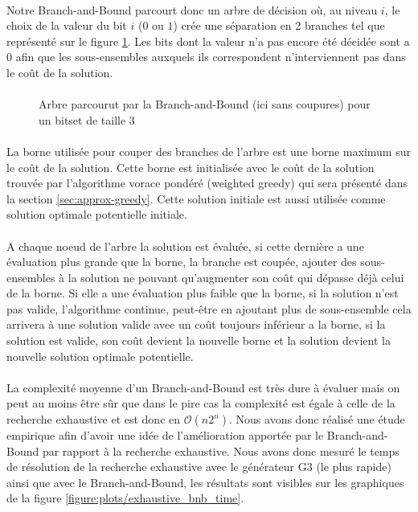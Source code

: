 \documentclass[12pt,letterpaper,twoside]{article}
\begin{document}
			\paragraph*{}
				Notre Branch-and-Bound parcourt donc un arbre de décision où, au niveau \(i\), le choix de la valeur du bit \(i\) (\(0\) ou \(1\)) crée une séparation en 2 branches tel que représenté sur le figure \ref{fig:bnb}. Les bits dont la valeur n'a pas encore été décidée sont a \(0\) afin que les sous-ensembles auxquels ils correspondent n'interviennent pas dans le coût de la solution.
			\paragraph*{}
			\begin{figure}[H]
				\centering%
				\resizebox{0.75\textwidth}{!}{}%
				\caption{Arbre parcourut par la Branch-and-Bound (ici sans coupures) pour un bitset de taille 3}%
				\label{fig:bnb}%
			\end{figure}
			\paragraph*{}
				La borne utilisée pour couper des branches de l'arbre est une borne maximum sur le coût de la solution. Cette borne est initialisée avec le coût de la solution trouvée par l'algorithme vorace pondéré (weighted greedy) qui sera présenté dans la section \ref{sec:approx-greedy}. Cette solution initiale est aussi utilisée comme solution optimale potentielle initiale.
			\paragraph*{}
				A chaque noeud de l'arbre la solution est évaluée, si cette dernière a une évaluation plus grande que la borne, la branche est coupée, ajouter des sous-ensembles à la solution ne pouvant qu'augmenter son coût qui dépasse déjà celui de la borne. Si elle a une évaluation plus faible que la borne, si la solution n'est pas valide, l'algorithme continue, peut-être en ajoutant plus de sous-ensemble cela arrivera à une solution valide avec un coût toujours inférieur a la borne, si la solution est valide, son coût devient la nouvelle borne et la solution devient la nouvelle solution optimale potentielle.
			\paragraph*{}
				La complexité moyenne d'un Branch-and-Bound est très dure à évaluer mais on peut au moins être sûr que dans le pire cas la complexité est égale à celle de la recherche exhaustive et est donc en \(\mathcal{O}(n2^n)\). Nous avons donc réalisé une étude empirique afin d'avoir une idée de l'amélioration apportée par le Branch-and-Bound par rapport à la recherche exhaustive. Nous avons donc mesuré le temps de résolution de la recherche exhaustive avec le générateur G3 (le plus rapide) ainsi que avec le Branch-and-Bound, les résultats sont visibles sur les graphiques de la figure \ref{figure:plots/exhaustive_bnb_time}.
\end{document}
